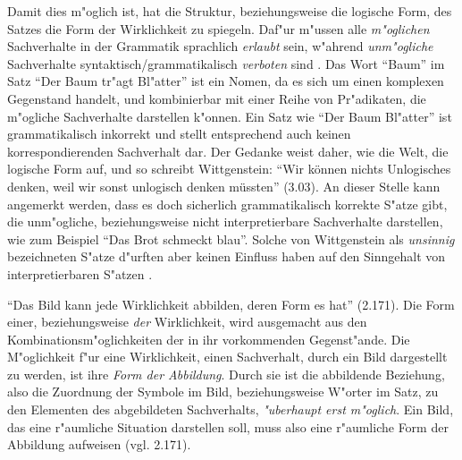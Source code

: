 \documentclass[a4paper, emulatestandardclasses, 12pt]{scrartcl}
\begin{document}
\begin{onehalfspace}

Damit dies m"oglich ist, hat die Struktur, beziehungsweise die logische Form, des Satzes die Form der Wirklichkeit zu spiegeln. Daf"ur m"ussen alle \emph{m"oglichen} Sachverhalte in der Grammatik sprachlich \emph{erlaubt} sein, w"ahrend \emph{unm"ogliche} Sachverhalte syntaktisch/grammatikalisch \emph{verboten} sind \cite[vgl.][S. 85 f.]{emiliani1999formsp}. Das Wort "`Baum"' im Satz "`Der Baum tr"agt Bl"atter"' ist ein Nomen, da es sich um einen komplexen Gegenstand handelt, und kombinierbar mit einer Reihe von Pr"adikaten, die m"ogliche Sachverhalte darstellen k"onnen. Ein Satz wie "`Der Baum Bl"atter"' ist grammatikalisch inkorrekt und stellt entsprechend auch keinen korrespondierenden Sachverhalt dar. Der Gedanke weist daher, wie die Welt, die logische Form auf, und so schreibt Wittgenstein: "`Wir können nichts Unlogisches denken, weil wir sonst unlogisch denken müssten"' (3.03). An dieser Stelle kann angemerkt werden, dass es doch sicherlich grammatikalisch korrekte S"atze gibt, die unm"ogliche, beziehungsweise nicht interpretierbare Sachverhalte darstellen, wie zum Beispiel "`Das Brot schmeckt blau"'. Solche von Wittgenstein als \emph{unsinnig} bezeichneten S"atze d"urften aber keinen Einfluss haben auf den Sinngehalt von interpretierbaren S"atzen \cite[vgl.][S. 86, 88 f.]{emiliani1999formsp}.  

"`Das Bild kann jede Wirklichkeit abbilden, deren Form es hat"' (2.171). Die Form einer, beziehungsweise \emph{der} Wirklichkeit, wird ausgemacht aus den Kombinationsm"oglichkeiten der in ihr vorkommenden Gegenst"ande. Die M"oglichkeit f"ur eine Wirklichkeit, einen Sachverhalt, durch ein Bild dargestellt zu werden, ist ihre \emph{Form der Abbildung}. Durch sie ist die abbildende Beziehung, also die Zuordnung der Symbole im Bild, beziehungsweise W"orter im Satz, zu den Elementen des abgebildeten Sachverhalts, \emph{"uberhaupt erst m"oglich}. Ein Bild, das eine r"aumliche Situation darstellen soll, muss also eine r"aumliche Form der Abbildung aufweisen (vgl. 2.171). 



\end{onehalfspace}
\end{document}
